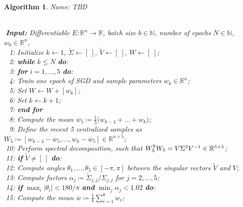 \documentclass[11pt, a4paper]{article}
\newtheorem{algorithm}[theorem]{Algorithm}
\newcommand{\N}{\mathbb{N}}
\newcommand{\R}{\mathbb{R}}
\newcommand*{\tr}{^{\mkern-1.5mu\mathsf{T}}}
\begin{document}
\begin{algorithm}
\caption{Name: TBD \textcolor{white}{$\Big |$}} \ \\
\textcolor{white}{$\Big |$}\textbf{Input:} Differentiable $E: \R^n \to \R$, batch size $b \in \N$, number of epochs $N \in \N$, $w_0 \in \R^n$, \\
\textcolor{white}{$\Big |0$}1: Initialize $k \leftarrow 1$, $\tilde{\Sigma} \leftarrow [ \ ]$, $\tilde{V} \leftarrow [ \ ]$, $W \leftarrow [ \ ]$; \\
\textcolor{white}{$\Big |0$}2: \textbf{while} $k\leq N$ \textbf{do}: \\
\textcolor{white}{$\Big |0$}3: \quad \textbf{for} $i=1, \dots, 5$ \textbf{do}: \\
\textcolor{white}{$\Big |0$}4: \quad \quad Train one epoch of SGD and sample parameters $w_k \in \R^n$; \\
\textcolor{white}{$\Big |0$}5: \quad \quad Set $W \leftarrow W + [w_k]$; \\
\textcolor{white}{$\Big |0$}6: \quad \quad Set $k \leftarrow k+1$; \\
\textcolor{white}{$\Big |0$}7: \quad \textbf{end for} \\
\textcolor{white}{$\Big |0$}8: \quad Compute the mean $\overline{w}_5 \coloneq \frac{1}{5} \big ( w_{k-4} + \dots + w_k \big )$; \\
\textcolor{white}{$\Big |0$}9: \quad Define the recent 5 centralized samples as $W_5 \coloneq [w_{k-4} - \overline{w}_5, \dots, w_k - \overline{w}_5] \in \R^{n \times 5}$; \\
\textcolor{white}{$\Big |$}10: \quad Perform spectral decomposition, such that $W_5\tr W_5 = V\Sigma^2V^{-1} \in \R^{5 \times 5}$; \\
\textcolor{white}{$\Big |$}11: \quad \textbf{if} $\tilde{V} \neq [ \ ]$ \textbf{do}: \\
\textcolor{white}{$\Big |$}12: \quad \quad Compute angles $\theta_1, \dots, \theta_5 \in [-\pi, \pi]$ between the singular vectors $\tilde{V}$ and $V$; \\
\textcolor{white}{$\Big |$}13: \quad \quad Compute factors $\alpha_j \coloneq \tilde{\Sigma}_{j,j} / \Sigma_{j,j}$ for $j=2,\dots,5$; \\
\textcolor{white}{$\Big |$}14: \quad \quad \textbf{if} $\max_i | \theta_i | < 180/\pi$ \textbf{and} $\min_j \alpha_j < 1.02$ \textbf{do}: \\
\textcolor{white}{$\Big |$}15: \quad \quad \quad Compute the mean $\overline{w} \coloneq \frac{1}{k} \sum_{i=1}^{k} w_i$; \\

\end{algorithm}
\end{document}
